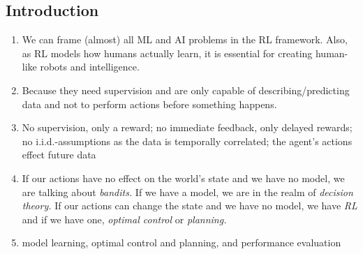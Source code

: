 		\subsection{Introduction}
			\begin{enumerate}
				\item We can frame (almost) all \ac{ML} and \ac{AI} problems in the \ac{RL} framework. Also, as \ac{RL} models how humans actually learn, it is essential for creating human-like robots and intelligence.
				\item Because they need supervision and are only capable of describing/predicting data and not to perform actions before something happens.  %
				\item No supervision, only a reward; no immediate feedback, only delayed rewards; no i.i.d.-assumptions as the data is temporally correlated; the agent's actions effect future data
				\item If our actions have no effect on the world's state and we have no model, we are talking about \emph{bandits.} If we have a model, we are in the realm of \emph{decision theory.} If our actions can change the state and we have no model, we have \emph{\ac{RL}} and if we have one, \emph{optimal control} or \emph{planning.}
				\item model learning, optimal control and planning, and performance evaluation
			\end{enumerate}

